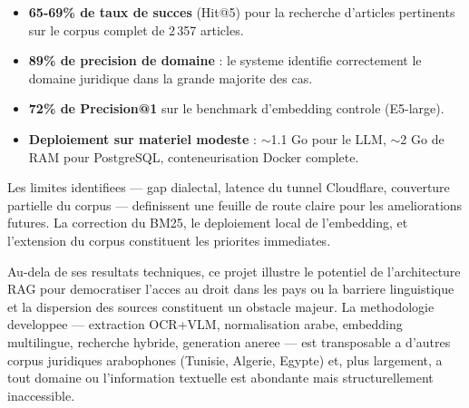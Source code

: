 \begin{itemize}
    \item \textbf{65-69\% de taux de succes} (Hit@5) pour la recherche d'articles pertinents sur le corpus complet de 2\,357 articles.
    \item \textbf{89\% de precision de domaine} : le systeme identifie correctement le domaine juridique dans la grande majorite des cas.
    \item \textbf{72\% de Precision@1} sur le benchmark d'embedding controle (E5-large).
    \item \textbf{Deploiement sur materiel modeste} : $\sim$1.1 Go pour le LLM, $\sim$2 Go de RAM pour PostgreSQL, conteneurisation Docker complete.
\end{itemize}

Les limites identifiees --- gap dialectal, latence du tunnel Cloudflare, couverture partielle du corpus --- definissent une feuille de route claire pour les ameliorations futures. La correction du BM25, le deploiement local de l'embedding, et l'extension du corpus constituent les priorites immediates.

Au-dela de ses resultats techniques, ce projet illustre le potentiel de l'architecture RAG pour democratiser l'acces au droit dans les pays ou la barriere linguistique et la dispersion des sources constituent un obstacle majeur. La methodologie developpee --- extraction OCR+VLM, normalisation arabe, embedding multilingue, recherche hybride, generation aneree --- est transposable a d'autres corpus juridiques arabophones (Tunisie, Algerie, Egypte) et, plus largement, a tout domaine ou l'information textuelle est abondante mais structurellement inaccessible.